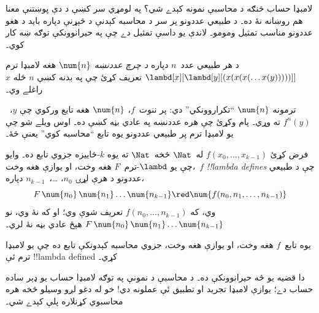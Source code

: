 \documentclass[../../../include/open-logic-section]{subfiles}
\begin{document}

لامبډا حساب څنګه د محاسبې نمونه کېدے شي؟ په لومړي سر کښې د دې
پوښتنې معنا هم روښانه نۀ ده۔ د طبيعي عددونو پر سر د محاسبه کېدنې د
څېړنې دپاره بايد د هغو عددونو مناسب تمثيل ومومو۔ لاندې يو داسې
تمثيل دے چې په حيرانوونکې توګه ښه کار کوي۔

\begin{defn}
د هر طبيعي عدد~$n$ دپاره \emph{د چرچ عددنښه} $\num{n}$ هغه لامبډا
ترم $\lambd[x][\lambd[y][(x(x(x(\dots x(y)))))]]$ تعريف کړئ چې
په بدنه کښې $n$ ځله $x$ راغلے وي۔
\end{defn}

ترمونه $\num{n}$ ``تکراروونکي'' دي: پر ننوت~$f$، $\num{n}$ هغه
تابع ورکوي چې $y$،~$f^n(y)$ ته وړي۔ پام وکړئ چې هره عددنښه په عادي
بڼه کښې ده۔ اوس ويلے شو چې يو لامبډا ترم پر طبيعي عددونو يوه تابع
``محاسبه کوي'' يعنې څۀ۔

\begin{defn}
فرض کړئ $f(x_0, \dots, x_{k-1})$ له~$\Nat$ څخه~$\Nat$ ته يوه
$k$-ځاييزه جزوي تابع ده۔ وايو چې يو $\lambd$-ترم~$F$ هغه وخت، او
يوازې هغه وخت،~$f$ \emph{!!{lambda define}s} چې د طبيعي عددونو د
هرې لړۍ $n_0$، \dots،~$n_{k-1}$ دپاره،
\[
F\, \num{n_0}\, \num{n_1} \dots \num{n_{k-1}} \red \num{f(n_0, n_1, \dots,
  n_{k-1})}
\]
وي، که $f(n_0, \dots, n_{k-1})$ تعريف شوې وي؛ او که نۀ وي، نو
$F\, \num{n_0}\, \num{n_1} \dots \num{n_{k-1}}$ هېڅ عادي بڼه
نۀ لري۔
\end{defn}

\begin{thm}
يوه تابع~$f$ هغه وخت، او يوازې هغه وخت، جزوي محاسبه کېدونکې تابع
ده چې يو لامبډا ترم ئې !!{lambda defined} کړي۔
\end{thm}

\begin{explain}
دا قضيه يو څه حيرانوونکې ده۔ د محاسبې د نمونې په توګه لامبډا حساب
يو ډېر ساده حساب دے؛ يوازې لامبډا تجريد او تطبيق ئې عملونه دي!{} خو
له دغو لږو وسيلو څخه هره محاسبوي کړنلاره پلې کېدے شي۔
\end{explain}
\end{document}
